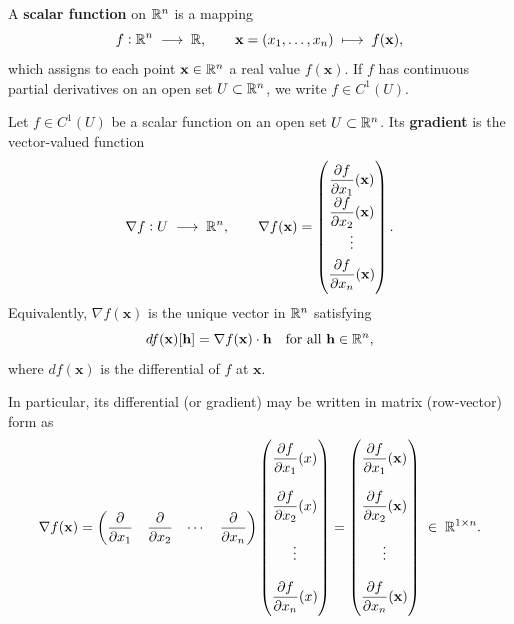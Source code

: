 \documentclass[11pt,openany]{article}
\renewcommand{\vec}[1]{\mathbf{#1}}
\renewcommand{\emph}[1]{\textbf{#1}}
\begin{document}
\begin{definition}
	A \emph{scalar function} on \(\mathbb{R}^n\) is a mapping
	\[
	f: \mathbb{R}^n \;\longrightarrow\;\mathbb{R},
	\qquad
	\mathbf x=(x_1,\dots,x_n)\;\longmapsto\;f(\mathbf x),
	\]
	which assigns to each point \(\mathbf x\in\mathbb{R}^n\) a real value \(f(\mathbf x)\).  If \(f\) has continuous partial derivatives on an open set \(U\subset\mathbb{R}^n\), we write \(f\in C^1(U)\).
\end{definition}
\begin{definition*}
	Let \(f\in C^1(U)\) be a scalar function on an open set \(U\subset\mathbb{R}^n\).  Its \emph{gradient} is the vector‐valued function
	\[
	\nabla f: U\;\longrightarrow\;\mathbb{R}^n,
	\qquad
	\nabla f(\mathbf x)
	=\begin{pmatrix}
		\dfrac{\partial f}{\partial x_1}(\mathbf x)\\[6pt]
		\dfrac{\partial f}{\partial x_2}(\mathbf x)\\[4pt]
		\vdots\\[4pt]
		\dfrac{\partial f}{\partial x_n}(\mathbf x)
	\end{pmatrix}.
	\]
	Equivalently, \(\nabla f(\mathbf x)\) is the unique vector in \(\mathbb{R}^n\) satisfying
	\[
	df(\mathbf x)[\mathbf h]
	=\nabla f(\mathbf x)\cdot\mathbf h
	\quad\text{for all }\mathbf h\in\mathbb{R}^n,
	\]
	where \(df(\mathbf x)\) is the differential of \(f\) at \(\mathbf x\).
\end{definition*}

\begin{remark*}	
	
In particular, its differential (or gradient) may be written in matrix (row‐vector) form as
\[
\nabla f(\vec{x})
=\begin{pmatrix}
	\displaystyle \frac{\partial}{\partial x_1}&
	\displaystyle \frac{\partial}{\partial x_2}&
	\cdots&
	\displaystyle \frac{\partial}{\partial x_n}
\end{pmatrix}\begin{pmatrix}
	\displaystyle \frac{\partial f}{\partial x_1}(x)\\ \\
	\displaystyle \frac{\partial f}{\partial x_2}(x)\\ \\
	\vdots\\ \\
	\displaystyle \frac{\partial f}{\partial x_n}(x)
\end{pmatrix}=\begin{pmatrix}
	\displaystyle \frac{\partial f}{\partial x_1}(\vec{x})\\ \\
	\displaystyle \frac{\partial f}{\partial x_2}(\vec{x})\\ \\
	\vdots\\ \\
	\displaystyle \frac{\partial f}{\partial x_n}(\vec{x})
\end{pmatrix}
\;\in\;\R^{1\times n}.
\]	
\end{remark*}
\end{document}
